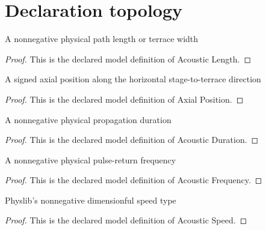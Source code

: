 \section{Declaration topology}
\begin{definition}
  \label{def:physics:phyx-mini-0310:phyxminiproblems-problemphyxmini0310-acousticlength}
  A nonnegative physical path length or terrace width
\end{definition}
\begin{proof}
  This is the declared model definition of Acoustic Length.
\end{proof}
\begin{definition}
  \label{def:physics:phyx-mini-0310:phyxminiproblems-problemphyxmini0310-axialposition}
  A signed axial position along the horizontal stage-to-terrace direction
\end{definition}
\begin{proof}
  This is the declared model definition of Axial Position.
\end{proof}
\begin{definition}
  \label{def:physics:phyx-mini-0310:phyxminiproblems-problemphyxmini0310-acousticduration}
  A nonnegative physical propagation duration
\end{definition}
\begin{proof}
  This is the declared model definition of Acoustic Duration.
\end{proof}
\begin{definition}
  \label{def:physics:phyx-mini-0310:phyxminiproblems-problemphyxmini0310-acousticfrequency}
  A nonnegative physical pulse-return frequency
\end{definition}
\begin{proof}
  This is the declared model definition of Acoustic Frequency.
\end{proof}
\begin{definition}
  \label{def:physics:phyx-mini-0310:phyxminiproblems-problemphyxmini0310-acousticspeed}
  Physlib's nonnegative dimensionful speed type
\end{definition}
\begin{proof}
  This is the declared model definition of Acoustic Speed.
\end{proof}

